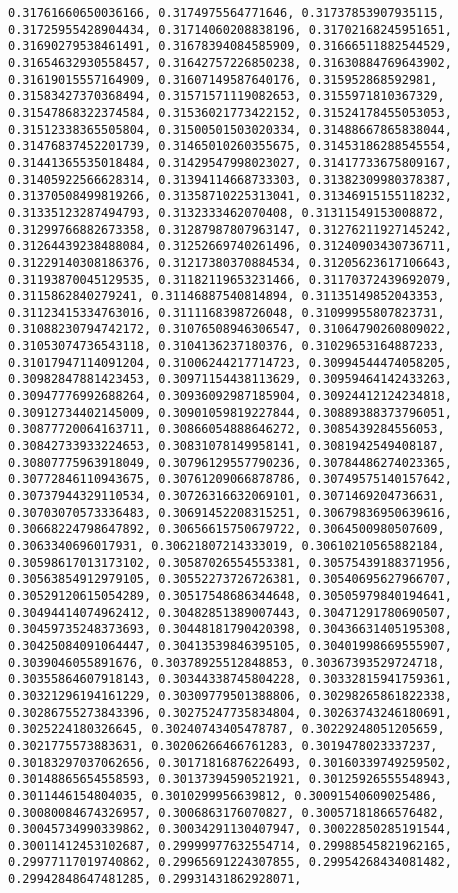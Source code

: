 \documentclass[11pt]{article}
\begin{document}
\begin{Verbatim}[commandchars=\\\{\}]
0.31761660650036166, 0.3174975564771646, 0.31737853907935115, 0.31725955428904434, 0.31714060208838196, 0.31702168245951651, 0.31690279538461491, 0.31678394084585909, 0.31666511882544529, 0.31654632930558457, 0.31642757226850238, 0.31630884769643902, 0.31619015557164909, 0.31607149587640176, 0.315952868592981, 0.31583427370368494, 0.31571571119082653, 0.3155971810367329, 0.31547868322374584, 0.31536021773422152, 0.31524178455053053, 0.31512338365505804, 0.31500501503020334, 0.31488667865838044, 0.31476837452201739, 0.31465010260355675, 0.31453186288545554, 0.31441365535018484, 0.31429547998023027, 0.31417733675809167, 0.31405922566628314, 0.31394114668733303, 0.31382309980378387, 0.31370508499819266, 0.31358710225313041, 0.31346915155118232, 0.31335123287494793, 0.3132333462070408, 0.31311549153008872, 0.31299766882673358, 0.31287987807963147, 0.31276211927145242, 0.31264439238488084, 0.31252669740261496, 0.31240903430736711, 0.31229140308186376, 0.31217380370884534, 0.31205623617106643, 0.31193870045129535, 0.31182119653231466, 0.31170372439692079, 0.3115862840279241, 0.31146887540814894, 0.31135149852043353, 0.31123415334763016, 0.3111168398726048, 0.31099955807823731, 0.31088230794742172, 0.31076508946306547, 0.31064790260809022, 0.31053074736543118, 0.3104136237180376, 0.31029653164887233, 0.31017947114091204, 0.31006244217714723, 0.30994544474058205, 0.30982847881423453, 0.30971154438113629, 0.30959464142433263, 0.30947776992688264, 0.30936092987185904, 0.30924412124234818, 0.30912734402145009, 0.30901059819227844, 0.30889388373796051, 0.30877720064163711, 0.30866054888646272, 0.3085439284556053, 0.30842733933224653, 0.30831078149958141, 0.3081942549408187, 0.30807775963918049, 0.30796129557790236, 0.30784486274023365, 0.30772846110943675, 0.30761209066878786, 0.30749575140157642, 0.30737944329110534, 0.30726316632069101, 0.3071469204736631, 0.30703070573336483, 0.30691452208315251, 0.30679836950639616, 0.30668224798647892, 0.30656615750679722, 0.3064500980507609, 0.3063340696017931, 0.30621807214333019, 0.30610210565882184, 0.30598617013173102, 0.30587026554553381, 0.30575439188371956, 0.30563854912979105, 0.30552273726726381, 0.30540695627966707, 0.30529120615054289, 0.30517548686344648, 0.30505979840194641, 0.30494414074962412, 0.30482851389007443, 0.30471291780690507, 0.30459735248373693, 0.30448181790420398, 0.30436631405195308, 0.30425084091064447, 0.30413539846395105, 0.30401998669555907, 0.3039046055891676, 0.30378925512848853, 0.30367393529724718, 0.30355864607918143, 0.30344338745804228, 0.30332815941759361, 0.30321296194161229, 0.30309779501388806, 0.30298265861822338, 0.30286755273843396, 0.30275247735834804, 0.30263743246180691, 0.3025224180326645, 0.30240743405478787, 0.30229248051205659, 0.3021775573883631, 0.30206266466761283, 0.3019478023337237, 0.30183297037062656, 0.30171816876226493, 0.30160339749259502, 0.30148865654558593, 0.30137394590521921, 0.30125926555548943, 0.3011446154804035, 0.3010299956639812, 0.30091540609025486, 0.30080084674326957, 0.3006863176070827, 0.30057181866576482, 0.30045734990339862, 0.30034291130407947, 0.30022850285191544, 0.30011412453102687, 0.29999977632554714, 0.29988545821962165, 0.29977117019740862, 0.29965691224307855, 0.29954268434081482, 0.29942848647481285, 0.29931431862928071, 
\end{Verbatim}
\end{document}
